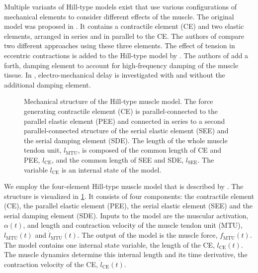 Multiple variants of Hill-type models exist that use various configurations of mechanical elements to consider different effects of the muscle. The original model was proposed in \cite{Hill1938}. It contains a contractile element (CE) and two elastic elements, arranged in series and in parallel to the CE.
The authors of \cite{Siebert2008} compare two different approaches using these three elements. The effect of tension in eccentric contractions is added to the Hill-type model by \cite{Till2008}. The authors of \cite{Gunther2007} add a forth, damping element to account for high-frequency damping of the muscle tissue. In \cite{Morl2012}, electro-mechanical delay is investigated with and without the additional damping element. 

\begin{figure}%
  \centering%
  \def\svgwidth{0.5\textwidth}
  \caption{Mechanical structure of the Hill-type muscle model. The force generating contractile element (CE) is parallel-connected to the parallel elastic element (PEE) and connected in series to a second parallel-connected structure of the serial elastic element (SEE) and the serial damping element (SDE). The length of the whole muscle tendon unit, $l_\text{MTU}$, is composed of the common length of CE and PEE, $l_\text{CE}$, and the common length of SEE and SDE, $l_\text{SEE}$. The variable $l_\text{CE}$ is an internal state of the model.}
  \label{fig:hilltype}%
\end{figure}%

\newcommand{\CE}{\text{CE}}
\newcommand{\MTU}{\text{MTU}}

We employ the four-element Hill-type muscle model that is described by \cite{Hilltype2014}. The structure is visualized in \cref{fig:hilltype}. It consists of four components: the contractile element (CE), the parallel elastic element (PEE), the serial elastic element (SEE) and the serial damping element (SDE). Inputs to the model are the muscular activation, $\alpha(t)$, and length and contraction velocity of the muscle tendon unit (MTU), $l_\MTU(t)$ and $\dot{l}_\MTU(t)$.
The output of the model is the muscle force, $f_\text{MTU}(t)$. The model contains one internal state variable, the length of the CE, $l_\text{CE}(t)$. The muscle dynamics determine this internal length and its time derivative, the contraction velocity of the CE, $\dot{l}_\text{CE}(t)$.


